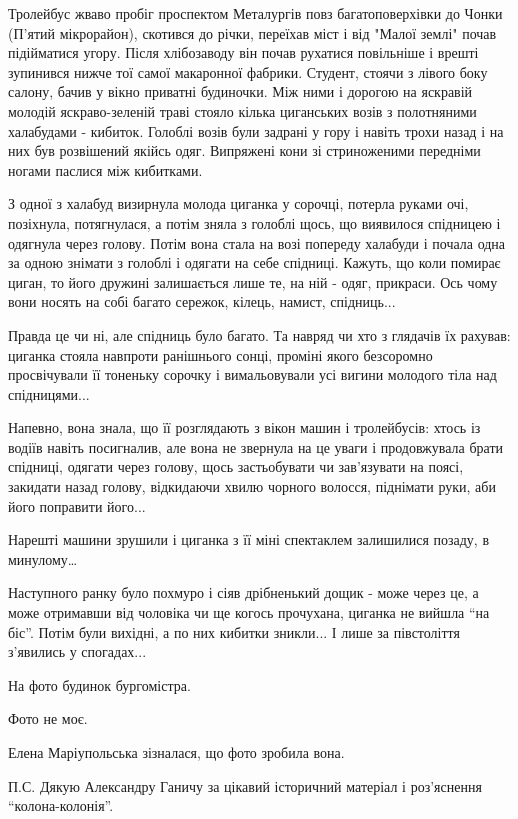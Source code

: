 Тролейбус жваво пробіг проспектом Металургів повз багатоповерхівки до Чонки
(П'ятий мікрорайон), скотився до річки, переїхав міст і від "Малої землі" почав
підійматися угору. Після хлібозаводу він почав рухатися повільніше і врешті
зупинився нижче тої самої макаронної фабрики. Студент, стоячи з лівого боку
салону, бачив у вікно приватні будиночки. Між ними і дорогою на яскравій
молодій яскраво-зеленій траві стояло кілька циганських возів з полотняними
халабудами - кибиток. Голоблі возів були задрані у гору і навіть трохи назад і
на них був розвішений якійсь одяг. Випряжені кони зі стриноженими передніми
ногами паслися між кибитками. 

З одної з халабуд визирнула молода циганка у сорочці, потерла руками очі,
позіхнула, потягнулася, а потім зняла з голоблі щось, що виявилося спідницею і
одягнула через голову. Потім вона стала на возі попереду халабуди і почала одна
за одною знімати з голоблі і одягати на себе спідниці. Кажуть, що коли помирає
циган, то його дружині залишається лише те, на ній - одяг, прикраси. Ось чому
вони носять на собі багато сережок, кілець, намист, спідниць...

Правда це чи ні, але спідниць було багато. Та навряд чи хто з глядачів їх
рахував: циганка стояла навпроти ранішнього сонці, проміні якого безсоромно
просвічували її тоненьку сорочку і вимальовували усі вигини молодого тіла над
спідницями...

Напевно, вона знала, що її розглядають з вікон машин і тролейбусів: хтось із
водіїв навіть посигналив, але вона не звернула на це уваги і продовжувала брати
спідниці, одягати через голову, щось застьобувати чи зав’язувати на поясі,
закидати назад голову, відкидаючи хвилю чорного волосся, піднімати руки, аби
його поправити його...

Нарешті машини зрушили і циганка з її міні спектаклем залишилися позаду, в
минулому…

Наступного ранку було похмуро і сіяв дрібненький дощик - може через це, а може
отримавши від чоловіка чи ще когось прочухана, циганка не вийшла \enquote{на
біс}.  Потім були вихідні, а по них кибитки зникли... І лише за півстоліття
з’явились у спогадах...

На фото будинок бургомістра.

Фото не моє.

Елена Маріупольська зізналася, що фото зробила вона.

П.С. Дякую Александру Ганичу за цікавий історичний матеріал і роз'яснення
\enquote{колона-колонія}.
